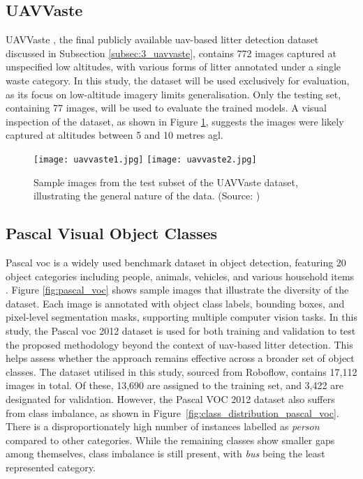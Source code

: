 \subsection{UAVVaste}
\label{subsec:4_uavvaste}

UAVVaste \cite{uavvaste}, the final publicly available \gls{uav}-based litter detection dataset discussed in Subsection \ref{subsec:3_uavvaste}, contains 772 images captured at unspecified low altitudes, with various forms of litter annotated under a single waste category. In this study, the dataset will be used exclusively for evaluation, as its focus on low-altitude imagery limits generalisation. Only the testing set, containing 77 images, will be used to evaluate the trained models. A visual inspection of the dataset, as shown in Figure \ref{fig:uavvaste_samples}, suggests the images were likely captured at altitudes between 5 and 10 metres \gls{agl}.

\begin{figure}[!htbp]
  \centering
  \texttt{[image: uavvaste1.jpg]}
  \hfill
  \texttt{[image: uavvaste2.jpg]}
  \caption{Sample images from the test subset of the UAVVaste dataset, illustrating the general nature of the data. (Source: \cite{uavvaste})}
  \label{fig:uavvaste_samples}
\end{figure}


\subsection{Pascal Visual Object Classes}
\label{subsec:4_pascal_voc}

Pascal \gls{voc} is a widely used benchmark dataset in object detection, featuring 20 object categories including people, animals, vehicles, and various household items \cite{pascal-voc-2012}. Figure \ref{fig:pascal_voc} shows sample images that illustrate the diversity of the dataset. Each image is annotated with object class labels, bounding boxes, and pixel-level segmentation masks, supporting multiple computer vision tasks. In this study, the Pascal \gls{voc} 2012 dataset is used for both training and validation to test the proposed methodology beyond the context of \gls{uav}-based litter detection. This helps assess whether the approach remains effective across a broader set of object classes. The dataset utilised in this study, sourced from Roboflow, contains 17,112 images in total. Of these, 13,690 are assigned to the training set, and 3,422 are designated for validation. However, the Pascal VOC 2012 dataset also suffers from class imbalance, as shown in Figure~\ref{fig:class_distribution_pascal_voc}. There is a disproportionately high number of instances labelled as \textit{person} compared to other categories. While the remaining classes show smaller gaps among themselves, class imbalance is still present, with \textit{bus} being the least represented category.

